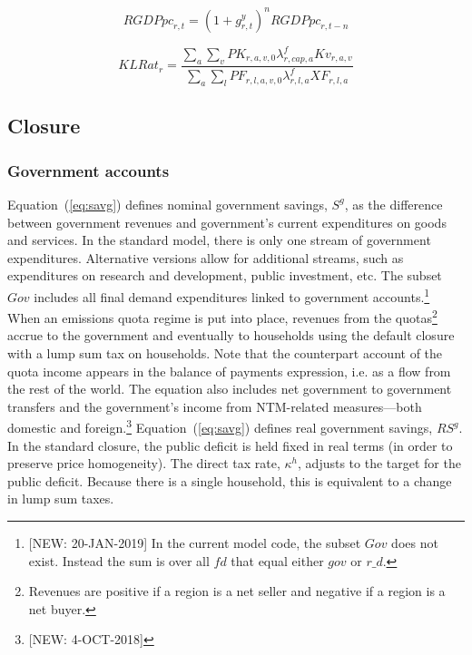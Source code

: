 \documentclass[11pt,letterpaper]{report}
\begin{document}
\begin{equation}
\label{eq:grgdppc}
\mathit{RGDPpc}_{r,t} = \left( 1 + g^y_{r,t} \right)^n \mathit{RGDPpc}_{r,t-n}
\end{equation}

\begin{equation}
\label{eq:klrat}
\mathit{KLRat}_r =
   \frac {\sum_a{\sum_v{\mathit{PK}_{r,a,v,0}
      \lambda^f_{r,\mathit{cap},a} \mathit{Kv_{r,a,v}} }} }
         {\sum_a{\sum_l{\mathit{PF}_{r,l,a,v,0}
      \lambda^f_{r,l,a} \mathit{XF_{r,l,a}} }} }
\end{equation}

\subsection{Closure}

\subsubsection{Government accounts}

Equation~(\ref{eq:savg}) defines nominal government savings, $\mathit{S^g}$, as
the difference between government revenues and government's current expenditures
on goods and services. In the standard model, there is only one stream
of government expenditures. Alternative versions allow for additional
streams, such as expenditures on research and development, public
investment, etc. The subset $\mathit{Gov}$ includes all final demand
expenditures linked to government accounts.\footnote{[NEW: 20-JAN-2019] In the current model
code, the subset $\mathit{Gov}$ does not exist. Instead the sum is over all $\mathit{fd}$
that equal either $\mathit{gov}$ or $\mathit{r\_d}$.}
When an emissions quota regime is put into place,
revenues from the quotas\footnote{Revenues are positive if a region is a net
seller and negative if a region is a net buyer.} accrue to the government and
eventually to households using the default closure with a lump sum tax on
households. Note that the counterpart account of the quota income appears in the
balance of payments expression, i.e. as a flow from the rest of the world.
The equation also includes net government to government transfers and the
government's income from NTM-related measures---both domestic and foreign.\footnote{[NEW: 4-OCT-2018]}
Equation~(\ref{eq:savg}) defines real government savings, $\mathit{RS^g}$. In
the standard closure, the public deficit is held fixed in real terms (in order
to preserve price homogeneity). The direct tax rate, $\kappa^h$, adjusts to the
target for the public deficit. Because there is a single household, this is
equivalent to a change in lump sum taxes.
\end{document}
